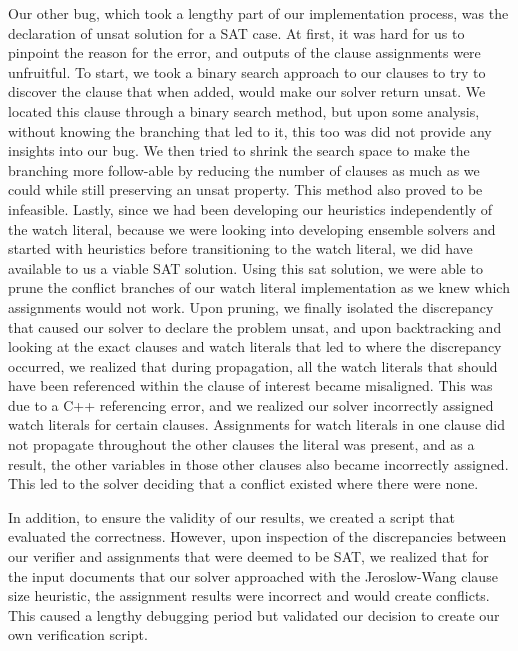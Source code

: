 \documentclass[titlepage]{article}
\begin{document}
\noindent Our other bug, which took a lengthy part of our implementation process, was the declaration of unsat solution for a SAT case. At first, it was hard for us to pinpoint the reason for the error, and outputs of the clause assignments were unfruitful. To start, we took a binary search approach to our clauses to try to discover the clause that when added, would make our solver return unsat. We located this clause through a binary search method, but upon some analysis, without knowing the branching that led to it, this too was did not provide any insights into our bug. We then tried to shrink the search space to make the branching more follow-able by reducing the number of clauses as much as we could while still preserving an unsat property. This method also proved to be infeasible. Lastly, since we had been developing our heuristics independently of the watch literal, because we were looking into developing ensemble solvers and started with heuristics before transitioning to the watch literal, we did have available to us a viable SAT solution. Using this sat solution, we were able to prune the conflict branches of our watch literal implementation as we knew which assignments would not work. Upon pruning, we finally isolated the discrepancy that caused our solver to declare the problem unsat, and upon backtracking and looking at the exact clauses and watch literals that led to where the discrepancy occurred, we realized that during propagation, all the watch literals that should have been referenced within the clause of interest became misaligned. This was due to a C++ referencing error, and we realized our solver incorrectly assigned watch literals for certain clauses. Assignments for watch literals in one clause did not propagate throughout the other clauses the literal was present, and as a result, the other variables in those other clauses also became incorrectly assigned. This led to the solver deciding that a conflict existed where there were none.  

\vspace{10pt}

\noindent In addition, to ensure the validity of our results, we created a script that evaluated the correctness. However, upon inspection of the discrepancies between our verifier and assignments that were deemed to be SAT, we realized that for the input documents that our solver approached with the Jeroslow-Wang clause size heuristic, the assignment results were incorrect and would create conflicts. This caused a lengthy debugging period but validated our decision to create our own verification script. 
\end{document}
